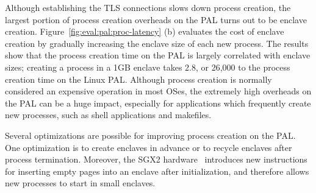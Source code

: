 Although establishing the TLS connections slows down
process creation,
the largest portion of process creation overheads
on the \sgx{} PAL
turns out to be enclave creation.
Figure~\ref{fig:eval:pal:proc-latency} (b)
evaluates the cost of enclave creation
by gradually increasing the enclave size of each new process.
The results show that
the process creation time on the \sgx{} PAL
is largely correlated with
enclave sizes;
creating a process in a 1GB enclave
takes \roughly{}2.8\asec{},
or 26,000\x{} to the process creation time
on the Linux PAL.
Although process creation
is normally considered an expensive operation
in most OSes,
the extremely high overheads
on the \sgx{} PAL
can be a huge impact, especially for applications which
frequently create new processes, such as shell applications and makefiles.


Several optimizations are possible for improving process creation
on the \sgx{} PAL.
One optimization
is to create enclaves in advance
or to recycle enclaves after process termination.
Moreover,
the SGX2 hardware~\cite{sgx2} introduces
new instructions for inserting empty pages into an enclave
after initialization,
and therefore allows new processes to start
in small enclaves.






